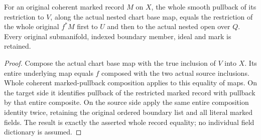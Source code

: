 \begin{theorem}
\label{hir:original-smooth-chart-intersection-whole-marked-dictionary}
\leanok
{}
For an original coherent marked record $M$ on $X$, the whole smooth
pullback of its restriction to $V$, along the actual nested chart base
map, equals the restriction of the whole original $f^*M$ first to $U$
and then to the actual nested open over $Q$. Every original submanifold,
indexed boundary member, ideal and mark is retained.
\end{theorem}
\begin{proof}
Compose the actual chart base map with the true inclusion of $V$ into
$X$. Its entire underlying map equals $f$ composed with the two actual
source inclusions. Whole coherent marked-pullback composition applies to
this equality of maps. On the target side it identifies pullback of the
restricted marked record with pullback by that entire composite. On the
source side apply the same entire composition identity twice, retaining
the original ordered boundary list and all literal marked fields. The
result is exactly the asserted whole record equality; no individual
field dictionary is assumed.
\end{proof}


